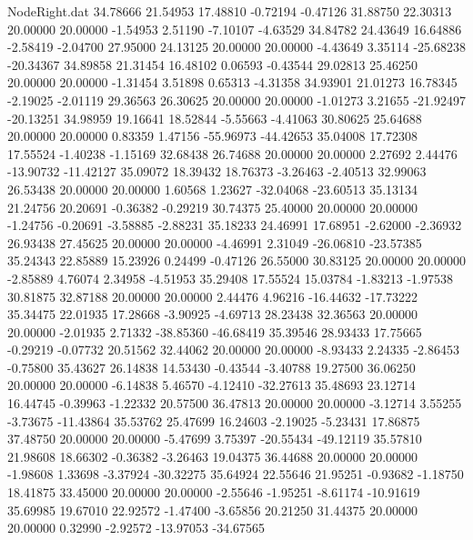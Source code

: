 \begin{filecontents}{NodeRight.dat}
  34.78666   21.54953   17.48810    -0.72194   -0.47126   31.88750   22.30313   20.00000   20.00000   -1.54953    2.51190   -7.10107   -4.63529
  34.84782   24.43649   16.64886    -2.58419   -2.04700   27.95000   24.13125   20.00000   20.00000   -4.43649    3.35114  -25.68238  -20.34367
  34.89858   21.31454   16.48102     0.06593   -0.43544   29.02813   25.46250   20.00000   20.00000   -1.31454    3.51898    0.65313   -4.31358
  34.93901   21.01273   16.78345    -2.19025   -2.01119   29.36563   26.30625   20.00000   20.00000   -1.01273    3.21655  -21.92497  -20.13251
  34.98959   19.16641   18.52844    -5.55663   -4.41063   30.80625   25.64688   20.00000   20.00000    0.83359    1.47156  -55.96973  -44.42653
  35.04008   17.72308   17.55524    -1.40238   -1.15169   32.68438   26.74688   20.00000   20.00000    2.27692    2.44476  -13.90732  -11.42127
  35.09072   18.39432   18.76373    -3.26463   -2.40513   32.99063   26.53438   20.00000   20.00000    1.60568    1.23627  -32.04068  -23.60513
  35.13134   21.24756   20.20691    -0.36382   -0.29219   30.74375   25.40000   20.00000   20.00000   -1.24756   -0.20691   -3.58885   -2.88231
  35.18233   24.46991   17.68951    -2.62000   -2.36932   26.93438   27.45625   20.00000   20.00000   -4.46991    2.31049  -26.06810  -23.57385
  35.24343   22.85889   15.23926     0.24499   -0.47126   26.55000   30.83125   20.00000   20.00000   -2.85889    4.76074    2.34958   -4.51953
  35.29408   17.55524   15.03784    -1.83213   -1.97538   30.81875   32.87188   20.00000   20.00000    2.44476    4.96216  -16.44632  -17.73222
  35.34475   22.01935   17.28668    -3.90925   -4.69713   28.23438   32.36563   20.00000   20.00000   -2.01935    2.71332  -38.85360  -46.68419
  35.39546   28.93433   17.75665    -0.29219   -0.07732   20.51562   32.44062   20.00000   20.00000   -8.93433    2.24335   -2.86453   -0.75800
  35.43627   26.14838   14.53430    -0.43544   -3.40788   19.27500   36.06250   20.00000   20.00000   -6.14838    5.46570   -4.12410  -32.27613
  35.48693   23.12714   16.44745    -0.39963   -1.22332   20.57500   36.47813   20.00000   20.00000   -3.12714    3.55255   -3.73675  -11.43864
  35.53762   25.47699   16.24603    -2.19025   -5.23431   17.86875   37.48750   20.00000   20.00000   -5.47699    3.75397  -20.55434  -49.12119
  35.57810   21.98608   18.66302    -0.36382   -3.26463   19.04375   36.44688   20.00000   20.00000   -1.98608    1.33698   -3.37924  -30.32275
  35.64924   22.55646   21.95251    -0.93682   -1.18750   18.41875   33.45000   20.00000   20.00000   -2.55646   -1.95251   -8.61174  -10.91619
  35.69985   19.67010   22.92572    -1.47400   -3.65856   20.21250   31.44375   20.00000   20.00000    0.32990   -2.92572  -13.97053  -34.67565

\end{filecontents}
